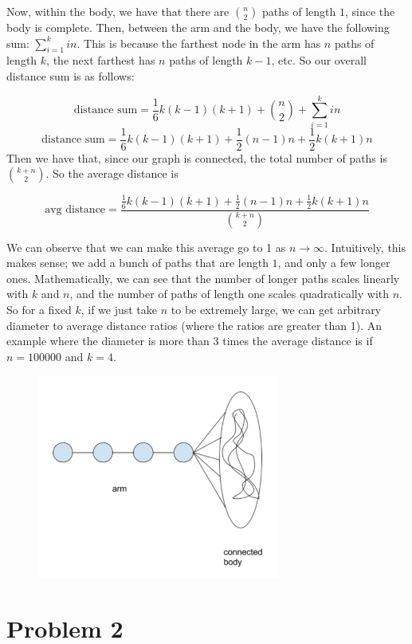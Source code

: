 \documentclass{article}
\begin{document}
\noindent Now, within the body, we have that there are $\binom{n}{2}$ paths of 
length $1$, since the body is complete. Then, between the arm and the body,
we have the following sum: $\sum_{i = 1}^k i n$. This is because the farthest
node in the arm has $n$ paths of length $k$, the next farthest has $n$ paths of
length $k-1$, etc. So our overall distance sum is as follows:

\[ \text{distance sum} = \frac{1}{6} k (k - 1)(k + 1) + \binom{n}{2} + 
    \sum_{i = 1}^k i n \]
\[ \text{distance sum} = \frac{1}{6} k (k - 1)(k + 1) + \frac{1}{2}(n-1)n + 
    \frac{1}{2}k(k+1)n \]
Then we have that, since our graph is connected, the total number of paths is 
$\binom{k + n}{2}$. So the average distance is

\[ \text{avg distance} = \frac{\frac{1}{6} k (k - 1)(k + 1) + \frac{1}{2}(n-1)n + 
    \frac{1}{2}k(k+1)n}{\binom{k + n}{2}} \]

\noindent We can observe that we can make this average go to 1 as 
$n \rightarrow \infty$. Intuitively, this makes sense; we add a bunch of paths
that are length $1$, and only a few longer ones. Mathematically, we can see that
the number of longer paths scales linearly with $k$ and $n$, and the number of paths 
of length one scales quadratically with $n$. So for a fixed $k$, if we just
take $n$ to be extremely large, we can get arbitrary diameter to average distance
ratios (where the ratios are greater than 1). An example where the diameter
is more than 3 times the average distance is if $n = 100000$ and $k = 4$.

\begin{figure}[h]
    \includegraphics[width=8cm]{graph1}
\end{figure}

\section*{Problem 2}
\end{document}
